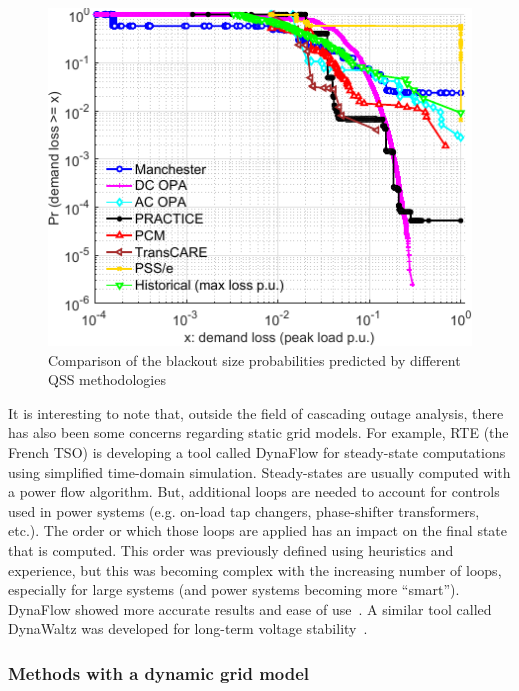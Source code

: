 \begin{figure}
    \centering
    \includegraphics[width=0.6\linewidth]{Figs/QSS_ccdf.pdf}
    \caption{Comparison of the blackout size probabilities predicted by different QSS methodologies~\cite{Benchmarking2018}}
    \label{fig:QSS_ccdf}
\end{figure}

It is interesting to note that, outside the field of cascading outage analysis, there has also been some concerns regarding static grid models. For example, RTE (the French TSO) is developing a tool called DynaFlow for steady-state computations using simplified time-domain simulation. Steady-states are usually computed with a power flow algorithm. But, additional loops are needed to account for controls used in power systems (e.g. on-load tap changers, phase-shifter transformers, etc.). The order or which those loops are applied has an impact on the final state that is computed. This order was previously defined using heuristics and experience, but this was becoming complex with the increasing number of loops, especially for large systems (and power systems becoming more ``smart''). DynaFlow showed more accurate results and ease of use~\cite{DynaFlow}. A similar tool called DynaWaltz was developed for long-term voltage stability~\cite{DynaWaltz}. %



\subsubsection{Methods with a dynamic grid model}
\label{sec:DynMethods}

